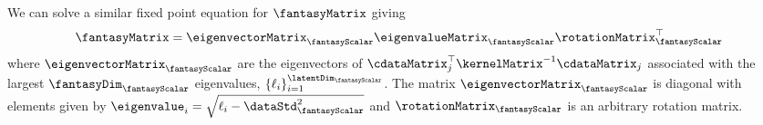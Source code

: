 We can solve a similar fixed point equation for $\fantasyMatrix$ giving
\[
\fantasyMatrix = \eigenvectorMatrix_\fantasyScalar
\eigenvalueMatrix_\fantasyScalar\rotationMatrix_\fantasyScalar^\top
\]
where $\eigenvectorMatrix_\fantasyScalar$ are the eigenvectors of
$\cdataMatrix_j^\top\kernelMatrix^{-1}\cdataMatrix_j$ associated
with the largest $\fantasyDim_\fantasyScalar$ eigenvalues,
$\left\{\ell_i\right\}_{i=1}^{\latentDim_\fantasyScalar}$. The matrix
$\eigenvectorMatrix_\fantasyScalar$ is diagonal with elements given by
$\eigenvalue_i=\sqrt{\ell_i-\dataStd^2_\fantasyScalar}$ and
$\rotationMatrix_\fantasyScalar$ is an arbitrary rotation matrix.

